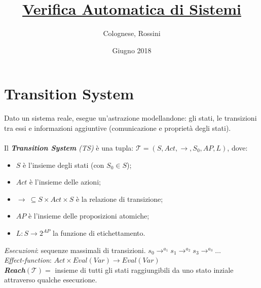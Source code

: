 \documentclass[a4paper, notitlepage, 9pt]{extreport}
\makeatletter
\newcommand*{\toccontents}{\@starttoc{toc}}
\makeatother
\begin{document}
	\title{\textbf{\underline{Verifica Automatica di Sistemi}}}
	\date{Giugno 2018}
	\author{Colognese, Rossini}
	\maketitle
	
	\toccontents

\chapter*{Transition System}
Dato un sistema reale, esegue un'astrazione modellandone: gli stati, le transizioni tra essi e informazioni aggiuntive (comunicazione e proprietà degli stati).\\\\
Il \textit{\textbf{Transition System} (TS)} è una tupla: $\mathcal{T} = (S, Act, \longrightarrow, S_0, AP, L)$, dove:
\begin{itemize}
	\item $S$ è l'insieme degli stati (con $S_0 \in S$);
	\item $Act$ è l'insieme delle azioni;
	\item $\longrightarrow ~\subseteq S \times Act \times S$ è la relazione di transizione;
	\item $AP$ è l'insieme delle proposizioni atomiche;
	\item $L: S \rightarrow 2^{AP}$ la funzione di etichettamento.
\end{itemize}
\textit{Esecuzioni}: sequenze massimali di transizioni. $s_0 \rightarrow^{a_1} s_1 \rightarrow^{a_2} s_3 \rightarrow^{a_3} \dots$\\
\textit{Effect-function}: $Act \times Eval(Var) \rightarrow Eval(Var)$\\
\textit{\textbf{Reach}}$(\mathcal{T}) = $ insieme di tutti gli stati raggiungibili da uno stato inziale attraverso qualche esecuzione.
\end{document}

